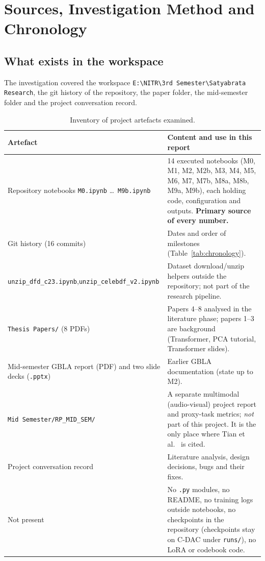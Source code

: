 \documentclass[10pt,a4paper]{article}
\begin{document}
\section{Sources, Investigation Method and Chronology}\label{sec:sources}

\subsection{What exists in the workspace}
The investigation covered the workspace \texttt{E:\textbackslash NITR\textbackslash 3rd Semester\textbackslash Satyabrata Research},
the git history of the repository, the paper folder, the mid-semester folder and the project
conversation record.

\begin{table}[H]\centering\small
\caption{Inventory of project artefacts examined.}\label{tab:inventory}
\begin{tabularx}{\linewidth}{@{}L{4.6cm}Y@{}}
\toprule
Artefact & Content and use in this report\\
\midrule
Repository notebooks \texttt{M0.ipynb} \dots\ \texttt{M9b.ipynb} & 14 executed notebooks (M0, M1, M2, M2b, M3, M4, M5, M6, M7, M7b, M8a, M8b, M9a, M9b), each holding code, configuration and outputs. \textbf{Primary source of every number.}\\
Git history (16 commits) & Dates and order of milestones (Table~\ref{tab:chronology}).\\
\texttt{unzip\_dfd\_c23.ipynb},\newline \texttt{unzip\_celebdf\_v2.ipynb} & Dataset download/unzip helpers outside the repository; not part of the research pipeline.\\
\texttt{Thesis Papers/} (8 PDFs) & Papers 4--8 analysed in the literature phase; papers 1--3 are background (Transformer, PCA tutorial, Transformer slides).\\
Mid-semester GBLA report (PDF) and two slide decks (\texttt{.pptx}) & Earlier GBLA documentation (state up to M2).\\
\texttt{Mid Semester/}\newline\texttt{RP\_MID\_SEM/} & A separate multimodal (audio-visual) project report and proxy-task metrics; \emph{not} part of this project. It is the only place where Tian et al.\ \cite{tian2023unsupervised} is cited.\\
Project conversation record & Literature analysis, design decisions, bugs and their fixes.\\
\midrule
Not present & No \texttt{.py} modules, no README, no training logs outside notebooks, no checkpoints in the repository (checkpoints stay on C-DAC under \texttt{runs/}), no LoRA or codebook code.\\
\bottomrule
\end{tabularx}
\end{table}
\end{document}
